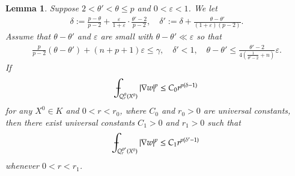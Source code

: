 \documentclass[11pt,oneside,english]{amsart}
\newcommand{\e}{\varepsilon}
\newcommand{\de}{\delta}
\newcommand{\D}{\nabla}
\numberwithin{equation}{section}
\def\Xint#1{\mathchoice
  {\XXint\displaystyle\textstyle{#1}}%
  {\XXint\textstyle\scriptstyle{#1}}%
  {\XXint\scriptstyle\scriptscriptstyle{#1}}%
  {\XXint\scriptscriptstyle\scriptscriptstyle{#1}}%
  \!\int}
\def\XXint#1#2#3{{\setbox0=\hbox{$#1{#2#3}{\int}$}
    \vcenter{\hbox{$#2#3$}}\kern-.5\wd0}}
\def\dashint{\Xint-}
\theoremstyle{plain}
\newtheorem{lemma}{Lemma}
\numberwithin{equation}{section}
\begin{document}
\begin{lemma}
    \label{lem:iter-deg-2}
     Suppose $2<\theta'<\theta\le p$ and $0<\e<1$. We let
    \begin{align}
        \label{eq:del-deg}
        \de:=\frac{p-\theta}{p-2}+\frac{\e}{1+\e}\cdot\frac{\theta'-2}{p-2},\quad \de':=\de+\frac{\theta-\theta'}{(1+\e)(p-2)}.
    \end{align}
    Assume that $\theta-\theta'$ and $\e$ are small with $\theta-\theta'\ll\e$ so that
    \begin{align}
        \label{eq:iter-cond-deg}
        \frac{p}{p-2}(\theta-\theta')+(n+p+1)\e\le\gamma,\quad\de'<1,\quad\theta-\theta'\le \frac{\theta'-2}{4\left(\frac{1}{\theta'-2}+n \right)}\e.
    \end{align}
    If
    $$
    \dashint_{Q_r^\theta(X^0)}|\D w|^p\le C_0r^{p(\de-1)}
    $$
    for any $X^0\in K$ and $0<r<r_0$, where $C_0$ and $r_0>0$ are universal constants, then there exist universal constants $C_1>0$ and $r_1>0$ such that
    $$
    \dashint_{Q_r^{\theta'}(X^0)}|\D w|^p\le C_1r^{p(\de'-1)}
    $$
    whenever $0<r<r_1$.
\end{lemma}
\end{document}
